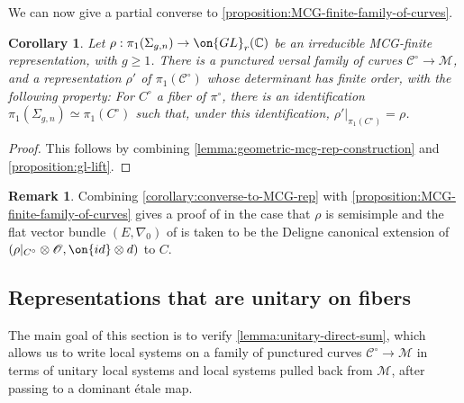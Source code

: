 \documentclass[12 pt]{amsart}
\theoremstyle{plain}
\newtheorem{corollary}[subsubsection]{Corollary}
\theoremstyle{definition}
\newtheorem{remark}[subsubsection]{Remark}
\theoremstyle{remark}
\numberwithin{equation}{section}
\begin{document}
We can now give a partial converse to \autoref{proposition:MCG-finite-family-of-curves}.
\begin{corollary}\label{corollary:converse-to-MCG-rep}
Let $\rho:\pi_1(\Sigma_{g,n})\to \on{GL}_r(\mathbb{C})$ be an irreducible MCG-finite
representation, with $g\geq 1$. 
There is a punctured versal family of curves
$\mathscr{C}^\circ\to \mathscr{M}$, and a representation $\rho'$ of
$\pi_1(\mathscr{C}^\circ)$ whose determinant has finite order, with the following property: For $C^\circ$ a fiber of
$\pi^\circ$, there is an identification $\pi_1(\Sigma_{g,n})\simeq
\pi_1(C^\circ)$ such that, under this identification, $\rho'|_{\pi_1(C^\circ)}=\rho$.
\end{corollary}
\begin{proof}
	This follows by combining \autoref{lemma:geometric-mcg-rep-construction} and \autoref{proposition:gl-lift}.
\end{proof}

\begin{remark}
	\label{remark:cousin-heu}
	Combining \autoref{corollary:converse-to-MCG-rep} with
	\autoref{proposition:MCG-finite-family-of-curves} gives a proof of
	\cite[Theorem A]{CH:isomonodromic}
	in the case that $\rho$ is semisimple and the flat vector bundle $(E, \nabla_0)$
	of \cite[Theorem A]{CH:isomonodromic} 
	is taken to be the Deligne canonical extension of
	$(\rho|_{C^\circ}\otimes \mathscr{O}, \on{id}\otimes d)$ to $C$.
\end{remark}



\subsection{Representations that are unitary on fibers}
\label{subsection:unitary-on-fibers}

The main goal of this section is to verify
\autoref{lemma:unitary-direct-sum}, which allows us to write local systems on a family of punctured curves $\mathscr{C}^\circ\to \mathscr{M}$ in terms of unitary local systems and local systems pulled back from $\mathscr{M}$, after passing to a dominant \'etale
map.
\end{document}
